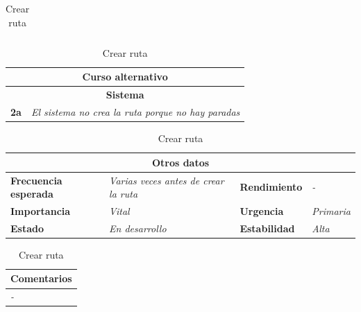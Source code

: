\documentclass[12pt,spanish]{article}
\begin{document}
\begin{table}[H]
\begin{tabular}{|m{5pt}|m{7.33cm}|m{5pt}|m{7.33cm}|}
		
	\end{tabular}
	
	\vspace{0.5cm}
	
	\begin{tabular}{|m{12pt}|m{15.5cm}|}
		\hline
		\multicolumn{2}{|c|}{\textbf{Curso alternativo}} \\
		\hline
		\multicolumn{2}{|c|}{\textbf{Sistema}} \\
		\hline
		\textbf{2a} & \textit{El sistema no crea la ruta porque no hay paradas} \\
		\hline
	
		
	\end{tabular}
	
	\vspace{0.5cm}
	
	\begin{tabular}{|m{3.75cm}|m{3.75cm}|m{3.75cm}|m{3.8cm}|}
		\hline
		\multicolumn{4}{|c|}{\textbf{Otros datos}} \\
		\hline
		\textbf{Frecuencia esperada} & \textit{Varias veces antes de crear la ruta} & \textbf{Rendimiento} & \textit{-} \\
		\hline
		\textbf{Importancia} & \textit{Vital} & \textbf{Urgencia} & \textit{Primaria} \\
		\hline
		\textbf{Estado} & \textit{En desarrollo} & \textbf{Estabilidad} & \textit{Alta} \\
		\hline
	\end{tabular}
	
	\vspace{1cm}
	
	\begin{tabular}{|m{16.2cm}|}
		\hline
		\textbf{Comentarios} \\
		\hline
		\textit{-} \\
		\hline
	\end{tabular}
	
	\caption{Crear ruta}
	
\end{table}
\end{document}
